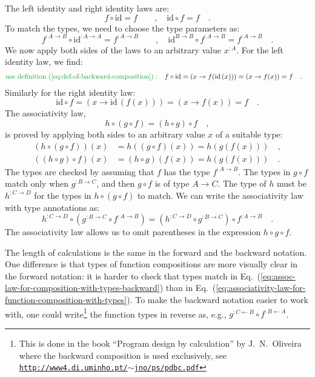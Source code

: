 The left identity and right identity laws are:
\[
f\circ\text{id}=f\quad\quad,\quad\text{id}\circ f=f\quad.
\]
To match the types, we need to choose the type parameters as:
\[
f^{:A\rightarrow B}\circ\text{id}^{:A\rightarrow A}=f^{:A\rightarrow B}\quad\quad,\quad\text{id}^{B\rightarrow B}\circ f^{:A\rightarrow B}=f^{:A\rightarrow B}\quad.
\]
We now apply both sides of the laws to an arbitrary value $x^{:A}$.
For the left identity law, we find:
\begin{align*}
{\color{greenunder}\text{use definition~(\ref{eq:def-of-backward-composition})}:}\quad & f\circ\text{id}=\left(x\rightarrow f(\text{id}\,(x))\right)=\left(x\rightarrow f(x)\right)=f\quad.
\end{align*}
Similarly for the right identity law:
\[
\text{id}\circ f=\left(x\rightarrow\text{id}\,(f(x))\right)=\left(x\rightarrow f\left(x\right)\right)=f\quad.
\]
The associativity law,
\[
h\circ\left(g\circ f\right)=\left(h\circ g\right)\circ f\quad,
\]
is proved by applying both sides to an arbitrary value $x$ of a suitable
type:
\begin{align*}
\left(h\circ\left(g\circ f\right)\right)(x) & =h\left(\left(g\circ f\right)(x)\right)=h\left(g\left(f\left(x\right)\right)\right)\quad,\\
\left(\left(h\circ g\right)\circ f\right)(x) & =\left(h\circ g\right)\left(f(x)\right)=h\left(g\left(f\left(x\right)\right)\right)\quad.
\end{align*}
The types are checked by assuming that $f$ has the type $f^{:A\rightarrow B}$.
The types in $g\circ f$ match only when $g^{:B\rightarrow C}$, and
then $g\circ f$ is of type $A\rightarrow C$. The type of $h$ must
be $h^{:C\rightarrow D}$ for the types in $h\circ\left(g\circ f\right)$
to match. We can write the associativity law with type annotations
as:
\begin{equation}
h^{:C\rightarrow D}\circ(g^{:B\rightarrow C}\circ f^{:A\rightarrow B})=(h^{:C\rightarrow D}\circ g^{:B\rightarrow C})\circ f^{:A\rightarrow B}\quad.\label{eq:assoc-law-for-composition-with-types-backward}
\end{equation}
The associativity law allows us to omit parentheses in the expression
$h\circ g\circ f$. 

The length of calculations is the same in the forward and the backward
notation. One difference is that types of function compositions are
more visually clear in the forward notation: it is harder to check
that types match in Eq.~(\ref{eq:assoc-law-for-composition-with-types-backward})
than in Eq.~(\ref{eq:associativity-law-for-function-composition-with-types}).
To make the backward notation easier to work with, one could write\footnote{This is done in the book \textsf{``}Program design by calculation\textsf{''} by J.~N.~Oliveira
where the backward composition is used exclusively, see \texttt{\href{http://www4.di.uminho.pt/~jno/ps/pdbc.pdf}{http://www4.di.uminho.pt/$\sim$jno/ps/pdbc.pdf}}} the function types in reverse as, e.g., $g^{:C\leftarrow B}\circ f^{:B\leftarrow A}$.

